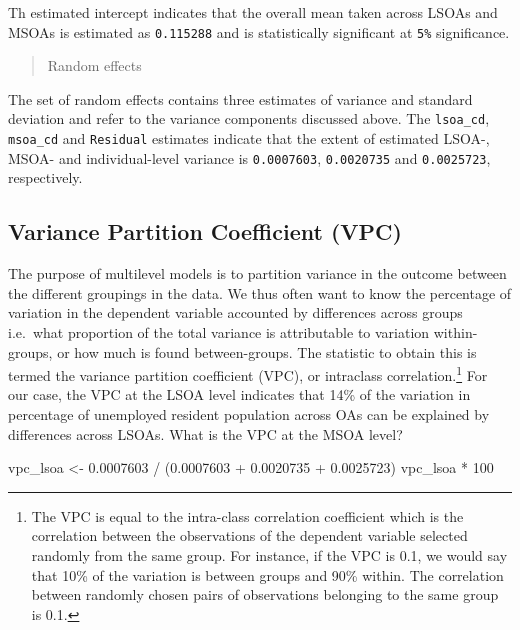 \documentclass[
  letterpaper,
  krantz2]{style/krantz}
\newenvironment{Shaded}{\begin{snugshade}}{\end{snugshade}}
\newcommand{\DecValTok}[1]{\textcolor[rgb]{0.68,0.00,0.00}{#1}}
\newcommand{\FloatTok}[1]{\textcolor[rgb]{0.68,0.00,0.00}{#1}}
\newcommand{\NormalTok}[1]{\textcolor[rgb]{0.00,0.23,0.31}{#1}}
\newcommand{\OtherTok}[1]{\textcolor[rgb]{0.00,0.23,0.31}{#1}}
\newcommand{\SpecialCharTok}[1]{\textcolor[rgb]{0.37,0.37,0.37}{#1}}
\begin{document}
Th estimated intercept indicates that the overall mean taken across
LSOAs and MSOAs is estimated as \texttt{0.115288} and is statistically
significant at \texttt{5\%} significance.

\begin{quote}
Random effects
\end{quote}

The set of random effects contains three estimates of variance and
standard deviation and refer to the variance components discussed above.
The \texttt{lsoa\_cd}, \texttt{msoa\_cd} and \texttt{Residual} estimates
indicate that the extent of estimated LSOA-, MSOA- and individual-level
variance is \texttt{0.0007603}, \texttt{0.0020735} and
\texttt{0.0025723}, respectively.

\hypertarget{variance-partition-coefficient-vpc}{%
\subsection{Variance Partition Coefficient
(VPC)}\label{variance-partition-coefficient-vpc}}

The purpose of multilevel models is to partition variance in the outcome
between the different groupings in the data. We thus often want to know
the percentage of variation in the dependent variable accounted by
differences across groups i.e.~what proportion of the total variance is
attributable to variation within-groups, or how much is found
between-groups. The statistic to obtain this is termed the variance
partition coefficient (VPC), or intraclass correlation.\footnote{The VPC
  is equal to the intra-class correlation coefficient which is the
  correlation between the observations of the dependent variable
  selected randomly from the same group. For instance, if the VPC is
  0.1, we would say that 10\% of the variation is between groups and
  90\% within. The correlation between randomly chosen pairs of
  observations belonging to the same group is 0.1.} For our case, the
VPC at the LSOA level indicates that 14\% of the variation in percentage
of unemployed resident population across OAs can be explained by
differences across LSOAs. What is the VPC at the MSOA level?

\begin{Shaded}
\begin{Highlighting}[]
\NormalTok{vpc\_lsoa }\OtherTok{\textless{}{-}} \FloatTok{0.0007603} \SpecialCharTok{/}\NormalTok{ (}\FloatTok{0.0007603} \SpecialCharTok{+} \FloatTok{0.0020735} \SpecialCharTok{+} \FloatTok{0.0025723}\NormalTok{)}
\NormalTok{vpc\_lsoa }\SpecialCharTok{*} \DecValTok{100}
\end{Highlighting}
\end{Shaded}
\end{document}
